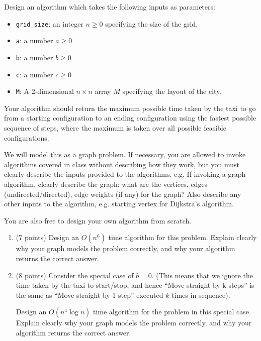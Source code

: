 \documentclass{assignment-373}
\begin{document}
\begin{enumerate}
Design an algorithm which takes the following inputs as parameters:
\begin{itemize}
\item \texttt{grid\_size}: an integer $n \ge 0$ specifying the size
  of the grid.
\item \texttt{a}: a number $a \ge 0$
\item \texttt{b}: a number $b \ge 0$
\item \texttt{c}: a number $c \ge 0$
\item \texttt{M}: A 2-dimensional $n \times n$ array $M$ specifying
  the layout of the city.
\end{itemize}

Your algorithm should return the maximum possible time taken by the
taxi to go from a starting configuration to an ending configuration
using the fastest possible sequence of steps, where the maximum is
taken over all possible feasible configurations.

We will model this as a graph problem.  If necessary, you are allowed
to invoke algorithms covered in class without describing how they
work, but you must clearly describe the inputs provided to the
algorithms. e.g. If invoking a graph algorithm, clearly describe the
graph: what are the vertices, edges (undirected/directed), edge
weights (if any) for the graph? Also describe any other inputs to the
algorithm, e.g. starting vertex for Dijkstra's algorithm.

You are also free to design your own algorithm from scratch.

\begin{enumerate}
\item (7 points) Design an $O(n^6)$ time algorithm for this
  problem. Explain clearly why your graph models the problem
  correctly, and why your algorithm returns the correct answer.
  
\item (8 points) Consider the special case of $b=0.$ (This means that
  we ignore the time taken by the taxi to start/stop, and hence ``Move
  straight by k steps'' is the same as ``Move straight by 1 step''
  executed $k$ times in sequence).

  Design an $O(n^4\log n)$ time algorithm for the problem in this
  special case. Explain clearly why your graph models the problem
  correctly, and why your algorithm returns the correct answer.
\end{enumerate}

\end{enumerate}
\end{document}
